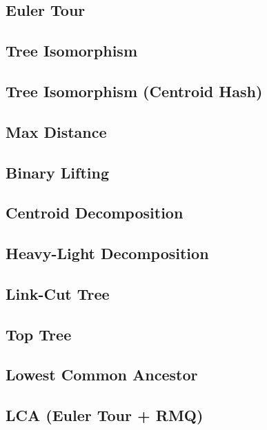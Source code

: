 \documentclass[10pt,letterpaper,landscape,twocolumn]{article}
\begin{document}
\subsection{Euler Tour}

\subsection{Tree Isomorphism}

\subsection{Tree Isomorphism (Centroid Hash)}

\subsection{Max Distance}

\subsection{Binary Lifting}

\subsection{Centroid Decomposition}

\subsection{Heavy-Light Decomposition}

\subsection{Link-Cut Tree}

\subsection{Top Tree}


\subsection{Lowest Common Ancestor}

\subsection{LCA (Euler Tour + RMQ)}

\end{document}
